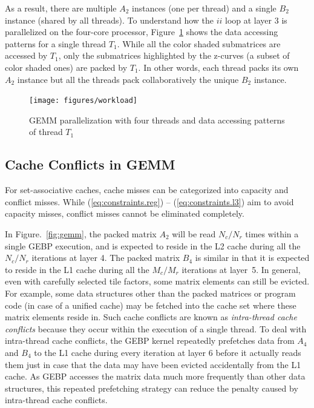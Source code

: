 As a result, there are multiple $A_2$ instances (one per thread)
and a single $B_2$ instance (shared by all threads).
To understand how the $ii$ loop at layer 3 is parallelized on the four-core processor, 
Figure~\ref{fig:workload} shows the data accessing patterns
for a single thread $T_1$.
While all the color shaded submatrices are accessed by $T_1$,
only the submatrices highlighted by the z-curves
(a subset of color shaded ones) are packed by $T_1$.
In other words, each thread packs its own $A_2$ instance but all the threads pack collaboratively the unique $B_2$ instance.

\begin{figure}[t]
  \centering
  \texttt{[image: figures/workload]}
  \caption{GEMM parallelization with four threads and data accessing patterns of thread $T_1$}
  \label{fig:workload}
\end{figure}

\subsection{Cache Conflicts in GEMM}\label{subsec:cache-conflicts}

For set-associative caches, cache misses can be categorized
into capacity and conflict misses.
While (\ref{eq:constraints.reg}) -- (\ref{eq:constraints.l3})
aim to avoid capacity misses,
conflict misses cannot be eliminated completely.

In Figure.~\ref{fig:gemm}, the packed matrix $A_2$
will be read $N_c/N_r$ times within a single GEBP execution,
and is expected to reside in the 
L2 cache during all the $N_c/N_r$ iterations at layer 4.
The packed matrix $B_4$ is similar in that it is expected to
reside in the L1 cache during all the
$M_c/M_r$ iterations at layer~5.
In general, even with carefully selected tile factors,
some matrix elements can still be evicted.
For example, some data structures other than the packed matrices
or program code (in case of a unified cache) may be fetched into the
cache set where these matrix elements reside in.
Such cache conflicts are known as
\emph{intra-thread cache conflicts}
because they occur within the execution of a single thread.
To deal with intra-thread cache conflicts,
the GEBP kernel repeatedly prefetches data from $A_4$ and $B_4$ to the L1 cache
during every iteration at layer 6 before it actually reads them just in case that
the data may have been evicted accidentally from the L1 cache.
As GEBP accesses the matrix data much more frequently than other
data structures, this repeated prefetching strategy
can reduce the penalty caused by intra-thread cache conflicts.

